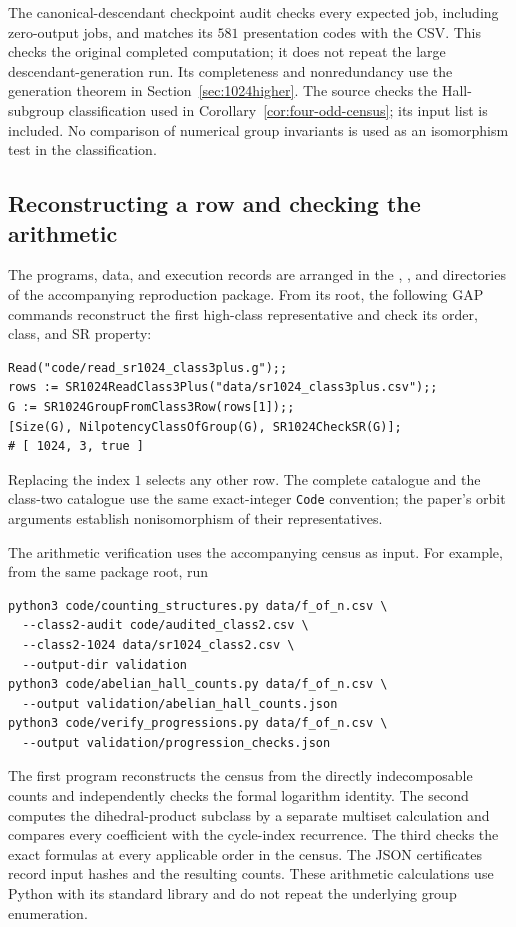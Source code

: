 \documentclass[11pt,a4paper]{amsart}
\theoremstyle{definition}
\theoremstyle{remark}
\numberwithin{equation}{section}
\begin{document}
The canonical-descendant checkpoint audit checks every expected job,
including zero-output jobs, and matches its $581$ presentation codes
with the CSV. This checks the original completed computation; it does
not repeat the large descendant-generation run. Its completeness and
nonredundancy use the generation theorem in Section~\ref{sec:1024higher}.
The source  checks the Hall-subgroup
classification used in Corollary~\ref{cor:four-odd-census}; its input list
is included. No comparison of numerical group invariants is used as an
isomorphism test in the classification.



\subsection{Reconstructing a row and checking the arithmetic}
\label{app:reconstruction-usage}
The programs, data, and execution records are arranged in the
, , and  directories of the
accompanying reproduction package. From its root, the following GAP
commands reconstruct the first high-class representative and check its
order, class, and SR property:
\begin{lstlisting}
Read("code/read_sr1024_class3plus.g");;
rows := SR1024ReadClass3Plus("data/sr1024_class3plus.csv");;
G := SR1024GroupFromClass3Row(rows[1]);;
[Size(G), NilpotencyClassOfGroup(G), SR1024CheckSR(G)];
# [ 1024, 3, true ]
\end{lstlisting}
Replacing the index $1$ selects any other row. The complete catalogue
 and the class-two catalogue use the
same exact-integer \texttt{Code} convention; the paper's orbit arguments
establish nonisomorphism of their representatives.

The arithmetic verification uses the accompanying census as input. For
example, from the same package root, run
\begin{lstlisting}
python3 code/counting_structures.py data/f_of_n.csv \
  --class2-audit code/audited_class2.csv \
  --class2-1024 data/sr1024_class2.csv \
  --output-dir validation
python3 code/abelian_hall_counts.py data/f_of_n.csv \
  --output validation/abelian_hall_counts.json
python3 code/verify_progressions.py data/f_of_n.csv \
  --output validation/progression_checks.json
\end{lstlisting}
The first program reconstructs the census from the directly
indecomposable counts and independently checks the formal logarithm
identity. The second computes the dihedral-product subclass by a
separate multiset calculation and compares every coefficient with the
cycle-index recurrence. The third checks the exact formulas at every
applicable order in the census. The JSON certificates record input
hashes and the resulting counts. These arithmetic calculations use
Python with its standard library and do not repeat the underlying
group enumeration.
\end{document}
